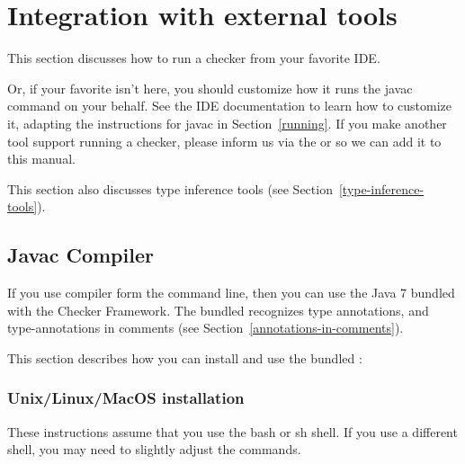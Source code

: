 \htmlhr
\chapter{Integration with external tools\label{external-tools}}

This section discusses how to run a checker from your favorite IDE\@.

Or, if your favorite isn't here, you should customize how it runs the
javac command on your behalf.  See the IDE documentation to learn how to
customize it, adapting the instructions for javac in Section~\ref{running}.
If you make another tool support running a checker, please
inform us via the
 or
 so
we can add it to this manual.

This section also discusses type inference tools (see
Section~\ref{type-inference-tools}).

\section{Javac Compiler\label{javac-installation}}

If you use  compiler form the command line, then you can use the
Java 7  bundled with the Checker Framework.  The bundled
 recognizes type annotations, and type-annotations in
comments (see Section~\ref{annotations-in-comments}).

This section describes how you can install and use the bundled :


\subsection{Unix/Linux/MacOS installation\label{unix-installation}}

These instructions assume that you use the bash or sh shell.  If you use a
different shell, you may need to slightly adjust the commands.

